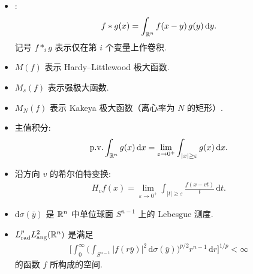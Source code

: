 \begin{itemize}
\item
  :
  \begin{align*}
    f * g(x) = \int_{\mathbb{R}^n} f(x - y) \, g(y) \, \mathrm{d}y.
  \end{align*}
  记号 $f *_i g$ 表示仅在第 $i$ 个变量上作卷积.

\item
  $M(f)$ 表示 Hardy--Littlewood 极大函数.

\item
  $M_s(f)$ 表示强极大函数.

\item
  $M_N(f)$ 表示 Kakeya 极大函数（离心率为 $N$ 的矩形）.

\item
  主值积分:
  \begin{align*}
    \mathrm{p.v.} \int_{\mathbb{R}^n} g(x) \, \mathrm{d}x
    = \lim_{\varepsilon \to 0^+} \int_{|x| \ge \varepsilon} g(x) \, \mathrm{d}x.
  \end{align*}

\item
  沿方向 $v$ 的希尔伯特变换:
  \begin{align*}
    H_v f(x) = \lim_{\varepsilon \to 0^+} \int_{|t| \ge \varepsilon} \frac{f(x - vt)}{t} \, \mathrm{d}t.
  \end{align*}

\item
  $\mathrm{d}\sigma(\bar{y})$ 是 $\mathbb{R}^n$ 中单位球面 $S^{n-1}$ 上的 Lebesgue 测度.

\item
  $L^p_{\mathrm{rad}} L^2_{\mathrm{ang}}(\mathbb{R}^n)$ 是满足
  \begin{align*}
    \Big[ \int_0^\infty \Big( \int_{S^{n-1}} |f(r\bar{y})|^2 \, \mathrm{d}\sigma(\bar{y}) \Big)^{p/2} r^{n-1} \, \mathrm{d}r \Big]^{1/p} < \infty
  \end{align*}
  的函数 $f$ 所构成的空间.
\end{itemize}
